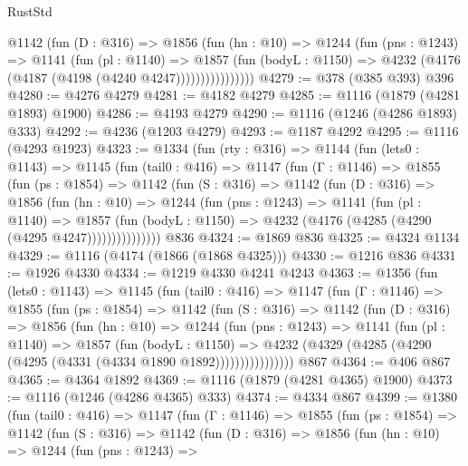 \begin{lexlean}{RustStd}
\begin{coremodule}
                @1142
                  (fun (D : @316) =>
                  @1856
                    (fun (hn : @10) =>
                    @1244
                      (fun (pns : @1243) =>
                      @1141
                        (fun (pl : @1140) =>
                        @1857
                          (fun (bodyL : @1150) =>
                          @4232 (@4176 (@4187 (@4198 (@4240 @4247))))))))))))))))
@4279 := @378 (@385 @393) @396
@4280 := @4276 @4279
@4281 := @4182 @4279
@4285 := @1116 (@1879 (@4281 @1893) @1900)
@4286 := @4193 @4279
@4290 := @1116 (@1246 (@4286 @1893) @333)
@4292 := @4236 (@1203 @4279)
@4293 := @1187 @4292
@4295 := @1116 (@4293 @1923)
@4323 := @1334
    (fun (rty : @316) =>
    @1144
      (fun (lets0 : @1143) =>
      @1145
        (fun (tail0 : @416) =>
        @1147
          (fun (Γ : @1146) =>
          @1855
            (fun (ps : @1854) =>
            @1142
              (fun (S : @316) =>
              @1142
                (fun (D : @316) =>
                @1856
                  (fun (hn : @10) =>
                  @1244
                    (fun (pns : @1243) =>
                    @1141
                      (fun (pl : @1140) =>
                      @1857
                        (fun (bodyL : @1150) =>
                        @4232 (@4176 (@4285 (@4290 (@4295 @4247)))))))))))))))
    @836
@4324 := @1869 @836
@4325 := @4324 @1134
@4329 := @1116 (@4174 (@1866 (@1868 @4325)))
@4330 := @1216 @836
@4331 := @1926 @4330
@4334 := @1219 @4330 @4241 @4243
@4363 := @1356
    (fun (lets0 : @1143) =>
    @1145
      (fun (tail0 : @416) =>
      @1147
        (fun (Γ : @1146) =>
        @1855
          (fun (ps : @1854) =>
          @1142
            (fun (S : @316) =>
            @1142
              (fun (D : @316) =>
              @1856
                (fun (hn : @10) =>
                @1244
                  (fun (pns : @1243) =>
                  @1141
                    (fun (pl : @1140) =>
                    @1857
                      (fun (bodyL : @1150) =>
                      @4232 (@4329 (@4285 (@4290 (@4295 (@4331 (@4334 @1890 @1892))))))))))))))))
    @867
@4364 := @406 @867
@4365 := @4364 @1892
@4369 := @1116 (@1879 (@4281 @4365) @1900)
@4373 := @1116 (@1246 (@4286 @4365) @333)
@4374 := @4334 @867
@4399 := @1380
    (fun (tail0 : @416) =>
    @1147
      (fun (Γ : @1146) =>
      @1855
        (fun (ps : @1854) =>
        @1142
          (fun (S : @316) =>
          @1142
            (fun (D : @316) =>
            @1856
              (fun (hn : @10) =>
              @1244
                (fun (pns : @1243) =>

\end{coremodule}
\end{lexlean}
